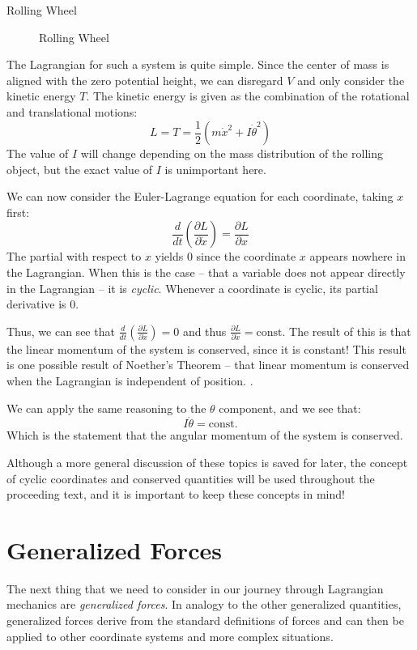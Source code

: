 \begin{example}{Rolling Wheel}
\begin{figure}[H]
\begin{tikzpicture}[x=0.75pt,y=0.75pt,yscale=-1,xscale=1]
\end{tikzpicture}
    \caption{Rolling Wheel}
    \label{fig:roll wheel}
\end{figure}
The \gls{Lagrangian} for such a system is quite simple. Since the center of mass is aligned with the zero potential height, we can disregard $V$ and only consider the kinetic energy $T$. The kinetic energy is given as the combination of the rotational and translational motions:
$$L=T=\frac{1}{2}\left(m\dot{x}^2+I\dot{\theta}^2\right)$$
The value of $I$ will change depending on the mass distribution of the rolling object, but the exact value of $I$ is unimportant here.

We can now consider the Euler-Lagrange equation for each coordinate, taking $x$ first:
$$\frac{d}{dt}\left(\frac{\partial L}{\partial \dot{x}}\right)=\frac{\partial L}{\partial x}$$
The partial with respect to $x$ yields $0$ since the coordinate $x$ appears nowhere in the \gls{Lagrangian}. When this is the case -- that a variable does not appear directly in the \gls{Lagrangian} -- it is \textit{cyclic}. Whenever a coordinate is cyclic, its partial derivative is 0.

Thus, we can see that $\frac{d}{dt}\left(\frac{\partial L}{\partial \dot{x}}\right)=0$ and thus $\frac{\partial L}{\partial \dot{x}}=\mathrm{const.}$ The result of this is that the linear momentum of the system is conserved, since it is constant! This result is one possible result of Noether's Theorem -- that linear momentum is conserved when the \gls{Lagrangian} is independent of position. .

We can apply the same reasoning to the $\theta$ component, and we see that:
$$I\dot{\theta}=\mathrm{const.}$$
Which is the statement that the angular momentum of the system is conserved.
\end{example}

Although a more general discussion of these topics is saved for later, the concept of cyclic coordinates and conserved quantities will be used throughout the proceeding text, and it is important to keep these concepts in mind!

\section{Generalized Forces}
The next thing that we need to consider in our journey through \gls{Lagrangian} mechanics are \textit{generalized  forces}. In analogy to the other generalized quantities, generalized forces derive from the standard definitions of forces and can then be applied to other coordinate systems and more complex situations.


